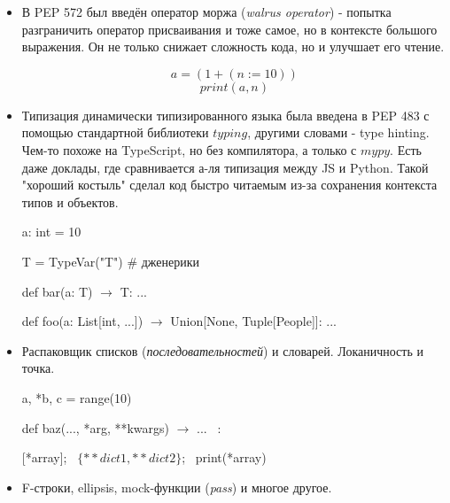 \documentclass[a4paper,12pt]{article}
\theoremstyle{plain} %
\theoremstyle{definition} %
\theoremstyle{remark} %
\begin{document}
\begin{itemize}
    \item В PEP 572 был введён оператор моржа (\textit{walrus operator}) - попытка разграничить оператор присваивания и тоже самое, но в контексте большого выражения. Он не только снижает сложность кода, но и улучшает его чтение. 

    $$a = (1 + (n := 10))$$
    $$print(a, n)$$

    \item Типизация динамически типизированного языка была введена в PEP 483 с помощью стандартной библиотеки $typing$, другими словами - type hinting. Чем-то похоже на TypeScript, но без компилятора, а только с $mypy$. Есть даже доклады, где сравнивается а-ля типизация между JS и Python. Такой "хороший костыль" сделал код быстро читаемым из-за сохранения контекста типов и объектов.

    a: int = 10

    T = TypeVar("T") \# дженерики

    def bar(a: T) $\rightarrow$ T: ...
    
    def foo(a: List[int, ...]) $\rightarrow$ Union[None, Tuple[People]]: ...

    \item Распаковщик списков (\textit{последовательностей}) и словарей. Локаничность и точка.

    a, *b, c = range(10)

    def baz(..., *arg, **kwargs) $\rightarrow$ ... \ :
    
    [*array]; \
    $\{**dict1, **dict2\}$; \
    print(*array)

    \item F-строки, ellipsis, mock-функции (\textit{pass}) и многое другое.
\end{itemize}
\end{document}
